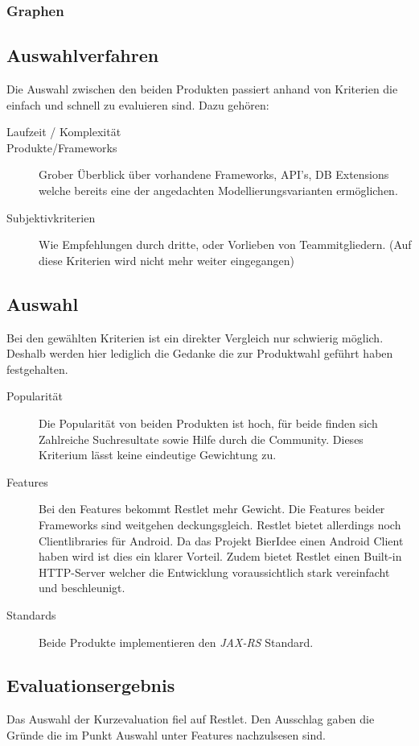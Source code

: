 \documentclass[10pt,a4paper]{scrartcl}
\begin{document}
\subsubsection{Graphen}
\subsection{Auswahlverfahren}
Die Auswahl zwischen den beiden Produkten passiert anhand von Kriterien die einfach und schnell zu evaluieren sind. Dazu gehören:

\begin{description}
	\item[Laufzeit / Komplexität]
	\item[Produkte/Frameworks]Grober Überblick über vorhandene Frameworks, API's, DB Extensions welche bereits eine der angedachten Modellierungsvarianten ermöglichen.
	\item[Subjektivkriterien]Wie Empfehlungen durch dritte, oder Vorlieben von Teammitgliedern. (Auf diese Kriterien wird nicht mehr weiter eingegangen)
\end{description}

\subsection{Auswahl}
Bei den gewählten Kriterien ist ein direkter Vergleich nur schwierig möglich. Deshalb werden hier lediglich die Gedanke die zur Produktwahl geführt haben festgehalten.

\begin{description}
	\item[Popularität]Die Popularität von beiden Produkten ist hoch, für beide finden sich Zahlreiche Suchresultate sowie Hilfe durch die Community. Dieses Kriterium lässt keine eindeutige Gewichtung zu.
	\item[Features]Bei den Features bekommt Restlet mehr Gewicht. Die Features beider Frameworks sind weitgehen deckungsgleich. Restlet bietet allerdings noch Clientlibraries für Android. Da das Projekt BierIdee einen Android Client haben wird ist dies ein klarer Vorteil. Zudem bietet Restlet einen Built-in HTTP-Server welcher die Entwicklung voraussichtlich stark vereinfacht und beschleunigt.
	\item[Standards]Beide Produkte implementieren den \textit{JAX-RS} Standard.
\end{description}

\subsection{Evaluationsergebnis}
Das Auswahl der Kurzevaluation fiel auf Restlet. Den Ausschlag gaben die Gründe die im Punkt Auswahl unter Features nachzulsesen sind.
\end{document}
